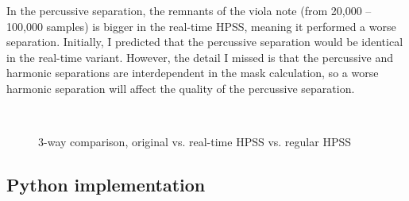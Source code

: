 \documentclass[letter,12pt]{article}
\begin{document}
In the percussive separation, the remnants of the viola note (from 20,000 -- 100,000 samples) is bigger in the real-time HPSS, meaning it performed a worse separation. Initially, I predicted that the percussive separation would be identical in the real-time variant. However, the detail I missed is that the percussive and harmonic separations are interdependent in the mask calculation, so a worse harmonic separation will affect the quality of the percussive separation.

\begin{figure}[ht]
	\centering
	\\
	\caption{3-way comparison, original vs. real-time HPSS vs. regular HPSS}
	\label{fig:rtresults3}
\end{figure}

\vfill
\clearpage %

\subsection{Python implementation}
\end{document}
